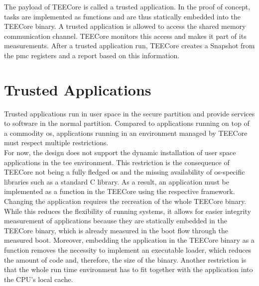 The payload of TEECore is called a trusted application. In the proof of concept,
tasks are implemented as functions and are thus statically embedded into the
TEECore binary. A trusted application is allowed to access the shared memory
communication channel. TEECore monitors this access and makes it part of its
measurements. After a trusted application run, TEECore creates a Snapshot from
the \gls{pmc} registers and a report based on this information.

\section{Trusted Applications}
\label{sec:30:tee_apps}
Trusted applications run in user space in the secure partition and provide
services to software in the normal partition. Compared to applications running
on top of a commodity \gls{os}, applications running in an environment managed
by TEECore must respect multiple restrictions.\\

For now, the design does not support the dynamic installation of user space
applications in the \gls{tee} environment. This restriction is the consequence of
TEECore not being a fully fledged \gls{os} and the missing availability of
\gls{os}-specific libraries such as a standard C library. As a result, an
application must be implemented as a function in the TEECore using the
respective framework. Changing the application requires the recreation of the
whole TEECore binary. While this reduces the flexibility of running systems, it
allows for easier integrity measurement of applications because they are
statically embedded in the TEECore binary, which is already measured in the boot
flow through the measured boot. Moreover, embedding the application in the
TEECore binary as a function removes the necessity to implement an executable
loader, which reduces the amount of code and, therefore, the size of the binary.
Another restriction is that the whole run time environment has to fit together
with the application into the CPU's local cache.\\

